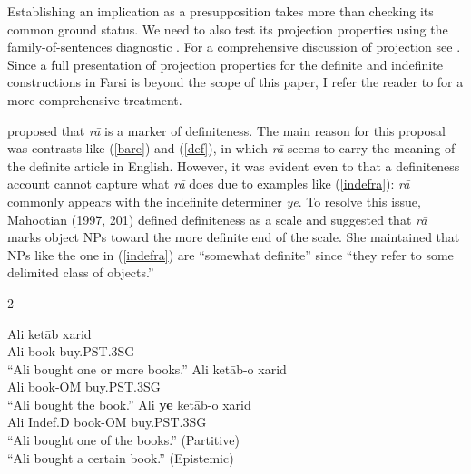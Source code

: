 \documentclass[12pt]{article}
\begin{document}
Establishing an implication as a presupposition takes more than checking its common ground status. We need to also test its projection properties using the family-of-sentences diagnostic \citep{chierchia1990meaning}. For a comprehensive discussion of projection see \cite{tonhauser2013toward}. Since a full presentation of projection properties for the definite and indefinite constructions in Farsi is beyond the scope of this paper, I refer the reader to \cite{jasbi2015, jasbi2016} for a more comprehensive treatment. 

\cite{mahootian1997} proposed that \emph{r\={a}} is a marker of definiteness. The main reason for this proposal was contrasts like (\ref{bare}) and (\ref{def}), in which \emph{r\={a}} seems to carry the meaning of the definite article in English. However, it was evident even to \cite{mahootian1997} that a definiteness account cannot capture what \emph{r\={a}} does due to examples like (\ref{indefra}): \emph{r\={a}} commonly appears with the indefinite determiner \emph{ye}. To resolve this issue, Mahootian (1997, 201) defined definiteness as a scale and suggested that \emph{r\={a}} marks object NPs toward the more definite end of the scale. She maintained that NPs like the one in (\ref{indefra}) are ``somewhat definite'' since ``they refer to some delimited class of objects.'' 

\begin {multicols} {2}
	\begin {exe}
		\ex \begin {xlist}
		\ex \label{bare} 
			\gll	Ali	ket\={a}b	xarid\\
			Ali	book	buy.{\scriptsize PST.3SG}\\
			``Ali bought one or more books.''
		\ex \label{def} 
			\gll	Ali	ket\={a}b-{\color {blue}o}	xarid\\
			Ali	book-{\scriptsize OM}	buy.{\scriptsize PST.3SG}\\
			``Ali bought the book.'' \columnbreak
		\ex \label{indefra} 
			\gll	Ali	{\color {red}\textbf{ye}} ket\={a}b-{\color {blue}o}	xarid\\
			Ali	{\scriptsize Indef.D} book-{\scriptsize OM}	buy.{\scriptsize PST.3SG}\\
			``Ali bought one of the books.'' (Partitive) \\ ``Ali bought a certain book.'' (Epistemic)
	\end {xlist}
	\end {exe}
\end {multicols}
\end{document}
